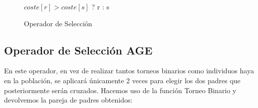 \begin{figure}[H]
	\centering
	\begin{minipage}{.9\linewidth}
		
		
		
		\begin{algorithm}[H] 
			\SetAlgoLined
			
			
			
			\hspace{0.7cm} \Return $coste[r]>coste[s]$ ? r : s \;
			
			
		\end{algorithm} 
		
	\end{minipage}
\end{figure}










\begin{figure}[H]
	\centering
	\begin{minipage}{.9\linewidth}
		
		
		
		\begin{algorithm}[H] 
			
			\caption{Operador de Selección}
			\SetAlgoLined
			
			
			
		\end{algorithm} 
		
	\end{minipage}
\end{figure}







\subsection{Operador de Selección AGE}
En este operador, en vez de realizar tantos torneos binarios como individuos haya en la población, se aplicará únicamente 2 veces para elegir los dos padres que posteriormente serán cruzados. Hacemos uso de la función Torneo Binario y devolvemos la pareja de padres obtenidos:


